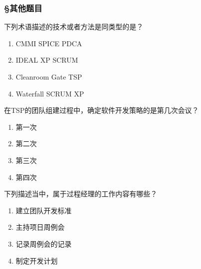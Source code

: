 \subsubsection*{\S 其他题目}
\setcounter{problemname}{0}

\begin{problem}
	下列术语描述的技术或者方法是同类型的是？
    \vspace{-0.8em}
    \begin{multicols}{2}
        \begin{enumerate}[label=\Alph*.]
            \item CMMI SPICE PDCA
            \item IDEAL XP SCRUM
            \item Cleanroom Gate TSP
            \item Waterfall SCRUM XP
        \end{enumerate}
    \end{multicols}
    \vspace{-1em}
\end{problem}




\begin{problem}
	在TSP的团队组建过程中，确定软件开发策略的是第几次会议？
    \vspace{-0.8em}
    \begin{multicols}{4}
        \begin{enumerate}[label=\Alph*.]
            \item 第一次
            \item 第二次
            \item 第三次
            \item 第四次
        \end{enumerate}
    \end{multicols}
    \vspace{-1em}
\end{problem}




\begin{problem}
	下列描述当中，属于过程经理的工作内容有哪些？
    \vspace{-0.8em}
    \begin{multicols}{4}
        \begin{enumerate}[label=\Alph*.]
            \item 建立团队开发标准
            \item 主持项日周例会
            \item 记录周例会的记录
            \item 制定开发计划
        \end{enumerate}
    \end{multicols}
    \vspace{-1em}
\end{problem}



